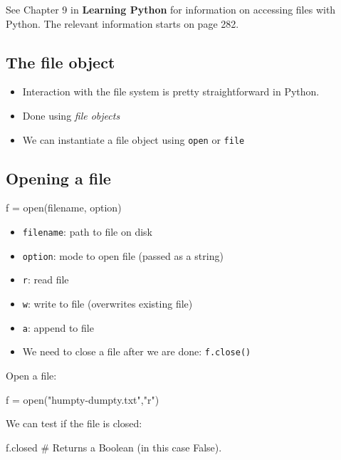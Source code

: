 \documentclass[12pt]{article} \newif\ifsolution\solutiontrue %
\begin{document}
See Chapter 9 in \textbf{Learning Python} for information on accessing
files with Python. The relevant information starts on page 282.

\subsection{The file object}\label{the-file-object}

\begin{itemize}
\item
  Interaction with the file system is pretty straightforward in Python.
\item
  Done using \emph{file objects}
\item
  We can instantiate a file object using \texttt{open} or \texttt{file}
\end{itemize}

\subsection{Opening a file}\label{opening-a-file}

\begin{python}
f = open(filename, option)
\end{python}

\begin{itemize}
\item
  \texttt{filename}: path to file on disk
\item
  \texttt{option}: mode to open file (passed as a string)
\item
  \texttt{\textquotesingle{}r\textquotesingle{}}: read file
\item
  \texttt{\textquotesingle{}w\textquotesingle{}}: write to file
  (overwrites existing file)
\item
  \texttt{\textquotesingle{}a\textquotesingle{}}: append to file
\item
  We need to close a file after we are done: \texttt{f.close()}
\end{itemize}

Open a file:

\begin{python}
f = open("humpty-dumpty.txt","r")
\end{python}

We can test if the file is closed:

\begin{python}
f.closed  # Returns a Boolean (in this case False).
\end{python}
\end{document}
